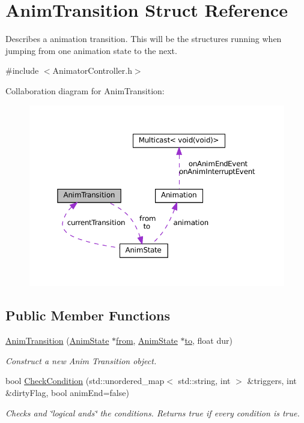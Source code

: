 \hypertarget{structAnimTransition}{}\section{Anim\+Transition Struct Reference}
\label{structAnimTransition}


Describes a animation transition. This will be the structures running when jumping from one animation state to the next.  




{\ttfamily \#include $<$Animator\+Controller.\+h$>$}



Collaboration diagram for Anim\+Transition\+:
\nopagebreak
\begin{figure}[H]
\begin{center}
\leavevmode
\includegraphics[width=350pt]{structAnimTransition__coll__graph}
\end{center}
\end{figure}
\subsection*{Public Member Functions}
\begin{DoxyCompactItemize}
\item 
\hyperlink{structAnimTransition_adae6a616bfb3af473694a911f6a454f8}{Anim\+Transition} (\hyperlink{structAnimState}{Anim\+State} $\ast$\hyperlink{structAnimTransition_a3a3a68577c477a031437d5f246141db7}{from}, \hyperlink{structAnimState}{Anim\+State} $\ast$\hyperlink{structAnimTransition_a73bd8f29355ac7b233647d296d9a061e}{to}, float dur)
\begin{DoxyCompactList}\small\item\em Construct a new Anim Transition object. \end{DoxyCompactList}\item 
bool \hyperlink{structAnimTransition_aff53599578475f1726655aefa40f67d2}{Check\+Condition} (std\+::unordered\+\_\+map$<$ std\+::string, int $>$ \&triggers, int \&dirty\+Flag, bool anim\+End=false)
\begin{DoxyCompactList}\small\item\em Checks and \char`\"{}logical ands\char`\"{} the conditions. Returns true if every condition is true. \end{DoxyCompactList}\end{DoxyCompactItemize}
